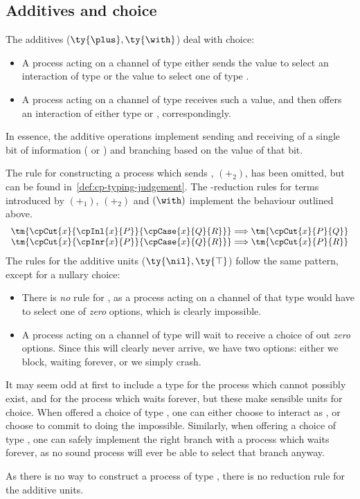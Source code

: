 \documentclass[UKenglish]{llncs}
\begin{document}
\subsection{Additives and choice}
\label{sec:cp-additives}
The additives ($\ty{\plus}, \ty{\with}$) deal with choice:
\begin{itemize}
\item
  A process acting on a channel of type  either sends the value
   to select an interaction of type  or the value
   to select one of type . 
\item
  A process acting on a channel of type  receives such a value,
  and then offers an interaction of either type  or ,
  correspondingly.
\end{itemize}
In essence, the additive operations implement sending and receiving of a single
bit of information ( or ) and branching based on
the value of that bit. 
\begin{center}
  \cpInfWith
\end{center}
The rule for constructing a process which sends , $(\plus_2)$,
has been omitted, but can be found in~\cref{def:cp-typing-judgement}.
The \textbeta-reduction rules for terms introduced by $(\plus_1)$, $(\plus_2)$
and $(\with)$ implement the behaviour outlined above.
\[
  \begin{array}{c}
    \tm{\cpCut{x}{\cpInl{x}{P}}{\cpCase{x}{Q}{R}}} \Longrightarrow \tm{\cpCut{x}{P}{Q}}
    \\
    \tm{\cpCut{x}{\cpInr{x}{P}}{\cpCase{x}{Q}{R}}} \Longrightarrow \tm{\cpCut{x}{P}{R}}
  \end{array}
\]
%
The rules for the additive units ($\ty{\nil}, \ty{\top}$) follow the same
pattern, except for a nullary choice:
\begin{itemize}
\item
  There is \emph{no} rule for \ty{\nil}, as a process acting on a channel of
  that type would have to select one of \emph{zero} options, which is clearly
  impossible.
\item
  A process acting on a channel of type \ty{\top} will wait to receive a choice
  of out \emph{zero} options. Since this will clearly never arrive, we have two
  options: either we block, waiting forever, or we simply crash.
\end{itemize}
It may seem odd at first to include a type for the process which cannot possibly
exist, and for the process which waits forever, but these make sensible units
for choice.
When offered a choice of type , one can either choose to
interact as , or choose to commit to doing the impossible.
Similarly, when offering a choice of type , one can safely
implement the right branch with a process which waits forever, as no sound
process will ever be able to select that branch anyway.
\begin{center}
  \cpInfNil
  \cpInfTop
\end{center}
As there is no way to construct a process of type \ty{\nil}, there is no
reduction rule for the additive units.
\end{document}
